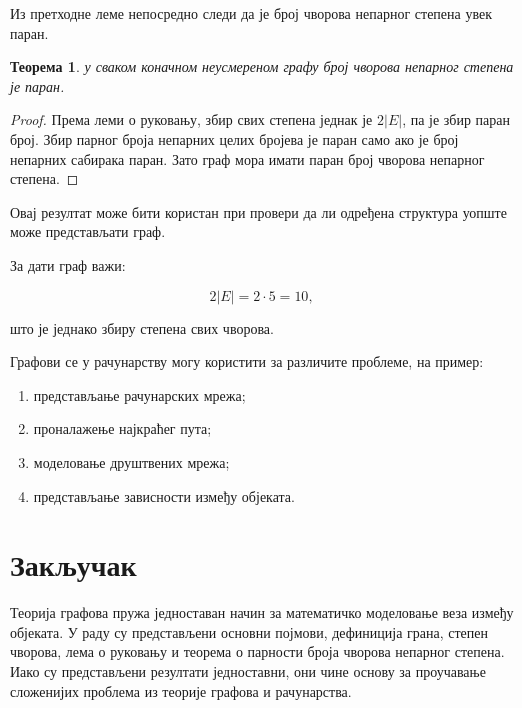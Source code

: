 \documentclass[12pt,a4paper]{article}
\newtheorem{teorema}{Теорема}[section]
\begin{document}
Из претходне леме непосредно следи да је број чворова непарног степена
увек паран.

\begin{teorema}
у сваком коначном неусмереном графу број чворова непарног степена је
паран.
\end{teorema}

\begin{proof}
Према леми о руковању, збир свих степена једнак је $2|E|$, па је
збир паран број. Збир парног броја непарних целих бројева је паран 
само ако је број непарних сабирака паран. Зато граф мора имати паран 
број чворова непарног степена.
\end{proof}

Овај резултат може бити користан при провери да ли одређена структура уопште
може представљати граф.


За дати граф важи:

$$
2|E|=2\cdot5=10,
$$

што је једнако збиру степена свих чворова.

Графови се у рачунарству могу користити за различите проблеме, на пример:

\begin{enumerate}[label=\arabic*.]
\item представљање рачунарских мрежа;
\item проналажење најкраћег пута;
\item моделовање друштвених мрежа;
\item представљање зависности између објеката.
\end{enumerate}

\section{Закључак}

Теорија графова пружа једноставан начин за математичко моделовање
веза између објеката. У раду су представљени основни појмови,
дефиниција грана, степен чворова, лема о руковању и теорема о парности 
броја чворова непарног степена. Иако су представљени резултати 
једноставни, они чине основу за проучавање сложенијих проблема из
теорије графова и рачунарства.
\end{document}
